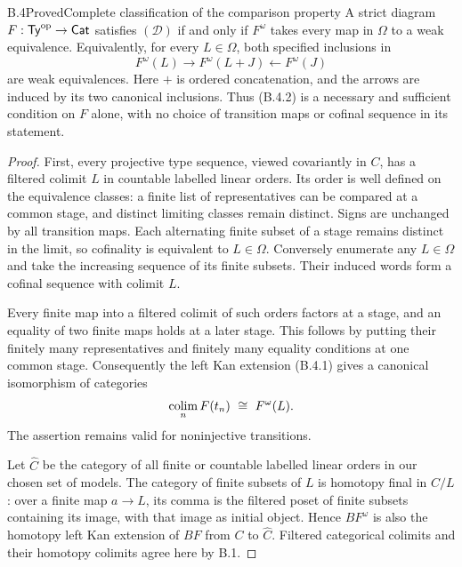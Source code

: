 \begin{claim}{B.4}{Proved}{Complete classification of the comparison property}
\label{B:classification}
A strict diagram $F:\mathsf{Ty}^{\mathrm{op}}\to\mathsf{Cat}$ satisfies $(\mathcal D)$
if and only if $F^\omega$ takes every map in $\Omega$ to a weak
equivalence. Equivalently, for every $L\in\Omega$, both specified
inclusions in
\[
 F^\omega(L)\longrightarrow F^\omega(L+J)
                 \longleftarrow F^\omega(J)
 \tag{B.4.2}
\]
are weak equivalences. Here $+$ is ordered concatenation, and
the arrows are induced by its two canonical inclusions.
Thus (B.4.2) is a necessary and sufficient condition on $F$ alone,
with no choice of transition maps or cofinal sequence in its statement.
\end{claim}
\begin{proof}
First, every projective type sequence, viewed covariantly in $C$,
has a filtered colimit $L$ in countable labelled linear orders.
Its order is well defined on the equivalence classes: a finite
list of representatives can be compared at a common stage, and
distinct limiting classes remain distinct. Signs are unchanged
by all transition maps. Each alternating finite subset of a stage
remains distinct in the limit, so cofinality is equivalent to
$L\in\Omega$. Conversely enumerate any $L\in\Omega$ and take
the increasing sequence of its finite subsets. Their induced
words form a cofinal sequence with colimit $L$.

Every finite map into a filtered colimit of such orders factors
at a stage, and an equality of two finite maps holds at a later
stage. This follows by putting their finitely many representatives
and finitely many equality conditions at one common stage.
Consequently the left Kan extension (B.4.1) gives a canonical
isomorphism of categories
\[
       \operatorname*{colim}_n F(t_n)\ \cong\ F^\omega(L).
\]
The assertion remains valid for noninjective transitions.

Let $\widehat C$ be the category of all finite or countable labelled
linear orders in our chosen set of models. The category of finite
subsets of $L$ is homotopy final in $C/L$: over a finite map
$a\to L$, its comma is the filtered poset of finite subsets
containing its image, with that image as initial object. Hence
$BF^\omega$ is also the homotopy left Kan extension of $BF$
from $C$ to $\widehat C$. Filtered categorical colimits and their
homotopy colimits agree here by B.1.


\end{proof}
